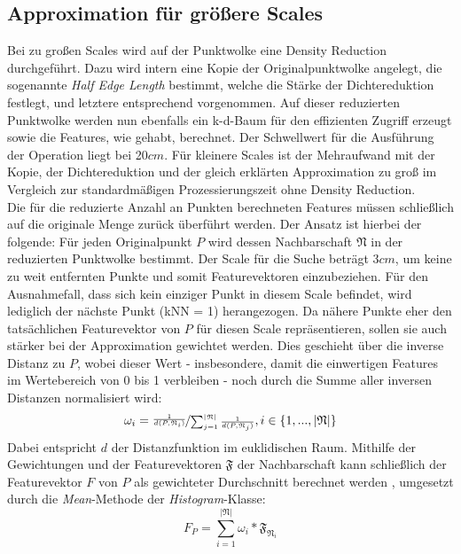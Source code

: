 \subsection{Approximation für größere Scales} 

Bei zu großen Scales wird auf der Punktwolke eine Density Reduction durchgeführt. Dazu wird intern eine Kopie der Originalpunktwolke angelegt, die sogenannte \textit{Half Edge Length} bestimmt, welche die Stärke der Dichtereduktion festlegt, und letztere entsprechend vorgenommen. Auf dieser reduzierten Punktwolke werden nun ebenfalls ein k-d-Baum für den effizienten Zugriff erzeugt sowie die Features, wie gehabt, berechnet. Der Schwellwert für die Ausführung der Operation liegt bei 20$cm$. Für kleinere Scales ist der Mehraufwand mit der Kopie, der Dichtereduktion und der gleich erklärten Approximation zu groß im Vergleich zur standardmäßigen Prozessierungszeit ohne Density Reduction. \\
Die für die reduzierte Anzahl an Punkten berechneten Features müssen schließlich auf die originale Menge zurück überführt werden. Der Ansatz ist hierbei der folgende: Für jeden Originalpunkt $P$ wird dessen Nachbarschaft $\mathfrak{N}$ in der reduzierten Punktwolke bestimmt. Der Scale für die Suche beträgt 3$cm$, um keine zu weit entfernten Punkte und somit Featurevektoren einzubeziehen. Für den Ausnahmefall, dass sich kein einziger Punkt in diesem Scale befindet, wird lediglich der nächste Punkt (kNN = 1) herangezogen. Da nähere Punkte eher den tatsächlichen Featurevektor von $P$ für diesen Scale repräsentieren, sollen sie auch stärker bei der Approximation gewichtet werden. Dies geschieht über die inverse Distanz zu $P$, wobei dieser Wert - insbesondere, damit die einwertigen Features im Wertebereich von 0 bis 1 verbleiben - noch durch die Summe aller inversen Distanzen normalisiert wird:
\begin{equation}
    \omega_i = \nicefrac{\frac{1}{d(P, \mathfrak{N}_i)}}{\sum_{j = 1}^{|\mathfrak{N}|}{\frac{1}{d(P, \mathfrak{N}_j)}}}, i \in \{1, ..., |\mathfrak{N}|\}
\end{equation}
Dabei entspricht $d$ der Distanzfunktion im euklidischen Raum. Mithilfe der Gewichtungen und der Featurevektoren $\mathfrak{F}$ der Nachbarschaft kann schließlich der Featurevektor $F$ von $P$ als gewichteter Durchschnitt berechnet werden \citep{Rusu.etal-2009}, umgesetzt durch die \textit{Mean}-Methode der \textit{Histogram}-Klasse:
\begin{equation}
    F_P = \sum\limits_{i = 1}^{|\mathfrak{N}|}{\omega_i * \mathfrak{F}_{\mathfrak{N}_i}}
\end{equation}

